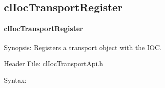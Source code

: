 \begin{flushleft}
\subsection{clIocTransportRegister}
\hypertarget{pageioc301}{}\paragraph{cl\-Ioc\-Transport\-Register}\label{pageioc301}
\begin{Desc}
\item[Synopsis:]Registers a transport object with the IOC.\end{Desc}
\begin{Desc}
\item[Header File:]clIocTransportApi.h\end{Desc}
\begin{Desc}
\item[Syntax:]


\end{Desc}
\end{flushleft}
